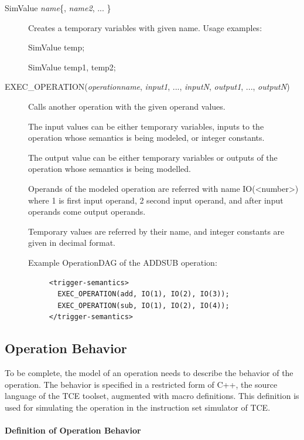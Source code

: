 \documentclass[twoside]{tceusermanual}
\begin{document}
\begin{description}

\item[SimValue \emph{name}\{, \emph{name2}, ... \}] %
  Creates a temporary variables with given name. Usage examples:

SimValue temp;

SimValue temp1, temp2;

\item[EXEC\_OPERATION(\emph{operationname}, \emph{input1}, ..., \emph{inputN}, \emph{output1}, ..., \emph{outputN})] 
 Calls another operation with the given operand values. 

The input values can be either temporary variables, inputs to the operation
whose semantics is being modeled, or integer constants.

The output value can be either temporary variables or outputs of the operation
whose semantics is being modelled.

Operands of the modeled operation are referred with name IO(<number>) 
where 1 is first input operand, 2 second input operand, and after input 
operands come output operands. 

Temporary values are referred by their name, and integer constants are given
in decimal format.

Example OperationDAG of the ADDSUB operation:

\begin{verbatim}
     <trigger-semantics>
       EXEC_OPERATION(add, IO(1), IO(2), IO(3));
       EXEC_OPERATION(sub, IO(1), IO(2), IO(4));
     </trigger-semantics>
\end{verbatim}


\end{description}


\subsection{Operation Behavior}
\label{ssec:operation-behavior}

To be complete, the model of an operation needs to describe the
behavior of the operation. The behavior is specified in a restricted
form of C++, the source language of the TCE toolset, augmented with
macro definitions.  This definition is used for simulating the
operation in the instruction set simulator of TCE.

\paragraph{Definition of Operation Behavior}
\end{document}
